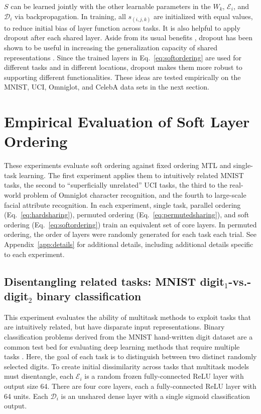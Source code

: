 \documentclass{article}
\theoremstyle{definition}
\theoremstyle{remark}
\begin{document}
$S$ can be learned jointly with the other learnable parameters in the $W_k$, $\mathcal{E}_i$, and $\mathcal{D}_i$ via backpropagation.
In training, all $s_{(i,j,k)}$ are initialized with equal values, to reduce initial bias of layer function across tasks.
It is also helpful to apply dropout after each shared layer. Aside from its usual benefits \citep{Srivastava:2014}, dropout has been shown to be useful in increasing the generalization capacity of shared representations \citep{Devin:2016}. Since the trained layers in Eq.~\ref{eq:softordering} are used for different tasks and in different locations, dropout makes them more robust to supporting different functionalities.
These ideas are tested empirically on the MNIST, UCI, Omniglot, and CelebA data sets in the next section.

\section{Empirical Evaluation of Soft Layer Ordering} \label{sec:exps}

These experiments evaluate soft ordering against fixed ordering MTL and single-task learning.
The first experiment applies them to intuitively related MNIST tasks, the second to ``superficially unrelated'' UCI tasks, the third to the real-world problem of Omniglot character recognition, and the fourth to large-scale facial attribute recognition.
In each experiment, single task, parallel ordering (Eq.~\ref{eq:hardsharing}), permuted ordering (Eq.~\ref{eq:permutedsharing}), and soft ordering (Eq.~\ref{eq:softordering}) train an equivalent set of core layers. 
In permuted ordering, the order of layers were randomly generated for each task each trial.
See Appendix~\ref{app:details} for additional details, including additional details specific to each experiment.

\subsection{Disentangling related tasks: MNIST digit$_1$-vs.-digit$_2$ binary classification}

This experiment evaluates the ability of multitask methods to exploit tasks that are intuitively related, but have disparate input representations.
Binary classification problems derived from the MNIST hand-written digit dataset are a common test bed for evaluating deep learning methods that require multiple tasks \citep{Fernando:2017,Kirkpatrick:2017,Yang:2017}.
Here, the goal of each task is to distinguish between two distinct randomly selected digits.
To create initial dissimilarity across tasks that multitask models must disentangle, 
each $\mathcal{E}_i$ is a random frozen fully-connected ReLU layer with output size 64.
There are four core layers, each a fully-connected ReLU layer with 64 units.
Each $\mathcal{D}_i$ is an unshared dense layer with a single sigmoid classification output. 
\end{document}
